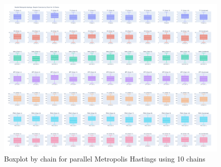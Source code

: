\begin{figure}[H]
    \centering
    \includegraphics[width=1\textwidth]{figures/parallel_mh/boxplot_10.png}
    \captionsetup{width=.8\textwidth}
    \caption{Boxplot by chain for parallel Metropolis Hastings using 10 chains}
    \label{fig:enter-label}
\end{figure}

